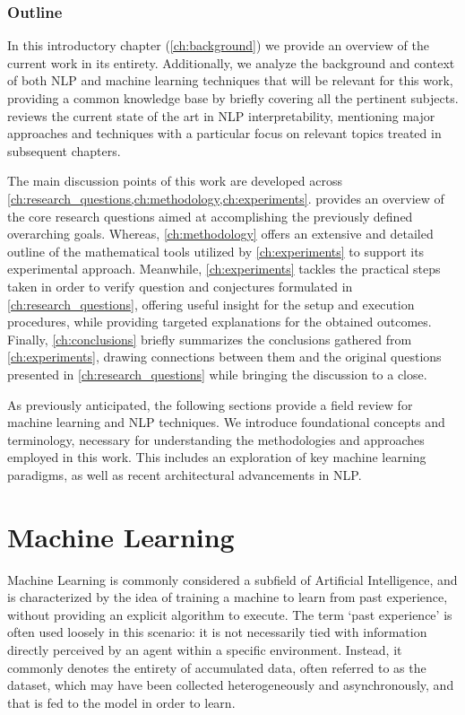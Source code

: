 \subsubsection*{Outline}

In this introductory chapter (\cref{ch:background}) we provide an overview of the current work in its entirety.
Additionally, we analyze the background and context of both NLP and machine learning techniques that will be relevant for this work, providing a common knowledge base by briefly covering all the pertinent subjects.
 reviews the current state of the art in NLP interpretability, mentioning major approaches and techniques with a particular focus on relevant topics treated in subsequent chapters.

The main discussion points of this work are developed across \cref{ch:research_questions,ch:methodology,ch:experiments}.
 provides an overview of the core research questions aimed at accomplishing the previously defined overarching goals.
Whereas, \cref{ch:methodology} offers an extensive and detailed outline of the mathematical tools utilized by \cref{ch:experiments} to support its experimental approach.
Meanwhile, \cref{ch:experiments} tackles the practical steps taken in order to verify question and conjectures formulated in \cref{ch:research_questions}, offering useful insight for the setup and execution procedures, while providing targeted explanations for the obtained outcomes.
Finally, \cref{ch:conclusions} briefly summarizes the conclusions gathered from \cref{ch:experiments}, drawing connections between them and the original questions presented in \cref{ch:research_questions} while bringing the discussion to a close. 

\vspace{1.5em}
\noindent As previously anticipated, the following sections provide a field review for machine learning and NLP techniques.
We introduce foundational concepts and terminology, necessary for understanding the methodologies and approaches employed in this work.
This includes an exploration of key machine learning paradigms, as well as recent architectural advancements in NLP.

\section{Machine Learning}

Machine Learning is commonly considered a subfield of Artificial Intelligence, and is characterized by the idea of training a machine to learn from past experience, without providing an explicit algorithm to execute.
The term `past experience' is often used loosely in this scenario: it is not necessarily tied with information directly perceived by an agent within a specific environment.
Instead, it commonly denotes the entirety of accumulated data, often referred to as the dataset, which may have been collected heterogeneously and asynchronously, and that is fed to the model in order to learn.

